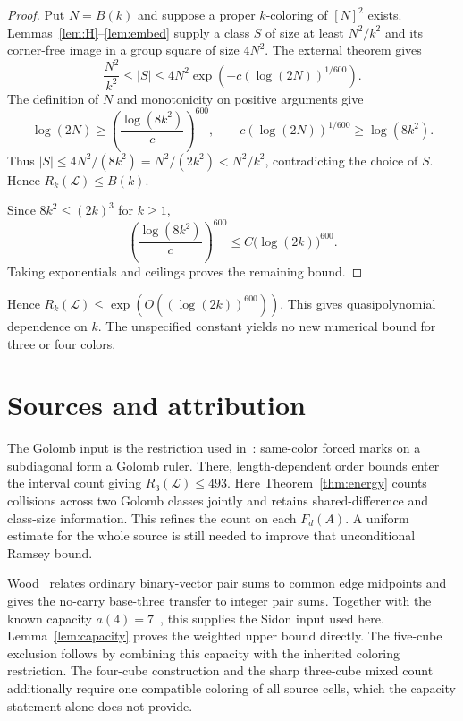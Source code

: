 \documentclass[11pt,a4paper]{article}
\newif\ifshowrevisions
\newenvironment{revision}{\par\begingroup\ifshowrevisions\color{red}\fi}{\par\endgroup}
\theoremstyle{definition}
\newcommand{\Lconf}{\mathcal L}
\numberwithin{equation}{section}
\begin{document}
\begin{proof}
	Put $N=B(k)$ and suppose a proper $k$-coloring of $[N]^2$ exists. Lemmas~\ref{lem:H}--\ref{lem:embed} supply a class $S$ of size at least $N^2/k^2$ and its corner-free image in a group square of size $4N^2$. The external theorem gives
	\[
	\frac{N^2}{k^2}\le|S|\le4N^2\exp\!\left(-c(\log(2N))^{1/600}\right).
	\]
	The definition of $N$ and monotonicity on positive arguments give
	\[
	\log(2N)\ge\left(\frac{\log(8k^2)}c\right)^{600},\qquad
	c(\log(2N))^{1/600}\ge\log(8k^2).
	\]
	Thus $|S|\le4N^2/(8k^2)=N^2/(2k^2)<N^2/k^2$, contradicting the choice of $S$. Hence $R_k(\Lconf)\le B(k)$.
	
Since $8k^2\le(2k)^3$ for $k\ge1$,
\[
\left(\frac{\log(8k^2)}{c}\right)^{600}
\le C\bigl(\log(2k)\bigr)^{600}.
\]
Taking exponentials and ceilings proves the remaining bound.
\end{proof}

Hence $R_k(\Lconf)\le\exp(O((\log(2k))^{600}))$. This gives quasipolynomial dependence on $k$. The unspecified constant yields no new numerical bound for three or four colors.

\section{Sources and attribution}\label{app:provenance}
\begin{revision}
The Golomb input is the restriction used in~\cite[Theorem~6]{MSY25}:
same-color forced marks on a subdiagonal form a Golomb ruler. There,
length-dependent order bounds enter the interval count giving
$R_3(\Lconf)\le493$. Here Theorem~\ref{thm:energy} counts collisions
across two Golomb classes jointly and retains shared-difference and
class-size information. This refines the count on each $F_d(A)$.
A uniform estimate for the whole source is still needed to improve that
unconditional Ramsey bound.
\end{revision}

\begin{revision}
Wood~\cite[Lemmas~4,6--7]{Wood05} relates ordinary binary-vector pair
sums to common edge midpoints and gives the no-carry base-three
transfer to integer pair sums. Together with the known capacity
$a(4)=7$~\cite{OEIS309370}, this supplies the Sidon input used here.
Lemma~\ref{lem:capacity} proves the weighted upper bound directly. The
five-cube exclusion follows by combining this capacity with the inherited
coloring restriction. The four-cube construction and the sharp
three-cube mixed count additionally require one compatible coloring
of all source cells, which the capacity statement alone does not
provide.
\end{revision}
\end{document}
